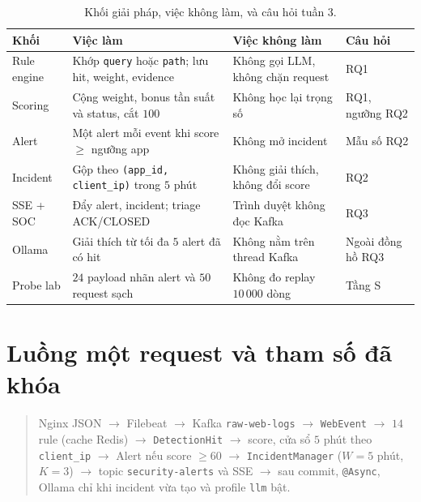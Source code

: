 \documentclass[a4paper,11pt]{article}
\begin{document}
\begin{table}[ht]
\centering
\caption{Khối giải pháp, việc không làm, và câu hỏi tuần 3.}
\label{tab:blocks}
\small
\begin{tabularx}{\linewidth}{@{}p{2.5cm}Y Y p{1.7cm}@{}}
\toprule
Khối & Việc làm & Việc không làm & Câu hỏi \\
\midrule
Rule engine & Khớp \texttt{query} hoặc \texttt{path}; lưu hit, weight, evidence & Không gọi LLM, không chặn request & RQ1 \\
Scoring & Cộng weight, bonus tần suất và status, cắt $100$ & Không học lại trọng số & RQ1, ngưỡng RQ2 \\
Alert & Một alert mỗi event khi score $\geq$ ngưỡng app & Không mở incident & Mẫu số RQ2 \\
Incident & Gộp theo \texttt{(app\_id, client\_ip)} trong $5$ phút & Không giải thích, không đổi score & RQ2 \\
SSE + SOC & Đẩy alert, incident; triage ACK/CLOSED & Trình duyệt không đọc Kafka & RQ3 \\
Ollama & Giải thích từ tối đa $5$ alert đã có hit & Không nằm trên thread Kafka & Ngoài đồng hồ RQ3 \\
Probe lab & $24$ payload nhãn alert và $50$ request sạch & Không đo replay $10\,000$ dòng & Tầng S \\
\bottomrule
\end{tabularx}
\end{table}

\section{Luồng một request và tham số đã khóa}

\begin{quote}
\small
Nginx JSON $\rightarrow$ Filebeat $\rightarrow$ Kafka \texttt{raw-web-logs} $\rightarrow$ \texttt{WebEvent}
$\rightarrow$ $14$ rule (cache Redis) $\rightarrow$ \texttt{DetectionHit}
$\rightarrow$ score, cửa sổ $5$ phút theo \texttt{client\_ip}
$\rightarrow$ Alert nếu score $\geq 60$
$\rightarrow$ \texttt{IncidentManager} ($W{=}5$ phút, $K{=}3$)
$\rightarrow$ topic \texttt{security-alerts} và SSE
$\rightarrow$ sau commit, \texttt{@Async}, Ollama chỉ khi incident vừa tạo và profile \texttt{llm} bật.
\end{quote}
\end{document}
